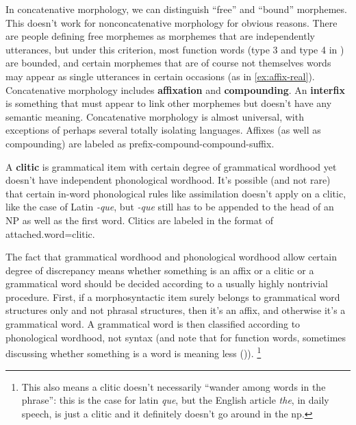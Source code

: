 \documentclass[UTF8, a4paper, oneside, scheme=plain]{ctexart}
\newcommand*{\concept}[1]{\textbf{#1}}
\newcommand*{\corpus}[1]{\emph{#1}}
\begin{document}
In concatenative morphology, we can distinguish ``free'' and ``bound'' morphemes. 
This doesn't work for nonconcatenative morphology for obvious reasons.
There are people defining free morphemes as morphemes that are independently utterances,
but under this criterion,
most function words (type 3 and type 4 in ) are bounded,
and certain morphemes that are of course not themselves words 
may appear as single utterances in certain occasions (as in \eqref{ex:affix-real}).
Concatenative morphology includes \concept{affixation} and \concept{compounding}.
An \concept{interfix} is something that must appear to link other morphemes 
but doesn't have any semantic meaning.
Concatenative morphology is almost universal, 
with exceptions of perhaps several totally isolating languages.
Affixes (as well as compounding) are labeled as prefix-compound-compound-suffix.

A \concept{clitic} is grammatical item with certain degree of grammatical wordhood 
yet doesn't have independent phonological wordhood.
It's possible (and not rare) 
that certain in-word phonological rules like assimilation doesn't apply on a clitic,
like the case of Latin \corpus{-que}, 
but \corpus{-que} still has to be appended to
the head of an NP as well as the first word.
Clitics are labeled in the format of attached.word=clitic. 

The fact that grammatical wordhood and phonological wordhood allow certain degree of discrepancy
means whether something is an affix or a clitic or a grammatical word should be decided according to 
a usually highly nontrivial procedure.
First, if a morphosyntactic item surely belongs to grammatical word structures only
and not phrasal structures,
then it's an affix,
and otherwise it's a grammatical word.
A grammatical word is then classified according to phonological wordhood, not syntax
(and note that for function words,
sometimes discussing whether something is a word is meaning less ()).%
\footnote{
    This also means a clitic doesn't necessarily ``wander among words in the phrase'':
    this is the case for latin \corpus{que},
    but the English article \corpus{the}, 
    in daily speech, is just a clitic 
    and it definitely doesn't go around in the \ac{np}.
}
\end{document}
